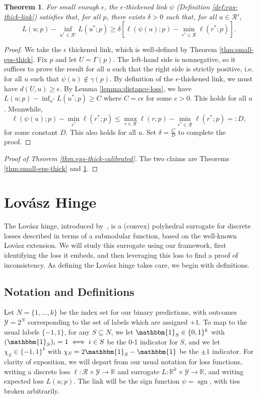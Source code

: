 \documentclass[12pt]{article}
\newcommand{\reals}{\mathbb{R}}
\newcommand{\R}{\mathcal{R}}
\newcommand{\Y}{\mathcal{Y}}
\newcommand{\ones}{\mathbbm{1}}
\DeclareMathOperator*{\sgn}{sgn}
\newtheorem{theorem}{Theorem}
\begin{document}
\begin{theorem} \label{thm:app-eps-thick-sep}
  For small enough $\epsilon$, the $\epsilon$-thickened link $\psi$ (Definition \ref{def:eps-thick-link}) satisfies that, for all $p$, there exists $\delta > 0$ such that, for all $u \in \R'$,
    \[ L(u;p) - \inf_{u^* \in \R'} L(u^*;p) \geq \delta \left[ \ell(\psi(u);p) - \min_{r^* \in \R} \ell(r^*;p) \right] . \]
\end{theorem}
\begin{proof}
  We take the $\epsilon$ thickened link, which is well-defined by Theorem \ref{thm:small-eps-thick}.
  Fix $p$ and let $U = \Gamma(p)$.
  The left-hand side is nonnegative, so it suffices to prove the result for all $u$ such that the right side is strictly positive, i.e. for all $u$ such that $\psi(u) \not\in \gamma(p)$.
  By definition of the $\epsilon$-thickened link, we must have $d(U,u) \geq \epsilon$.
  By Lemma \ref{lemma:distance-loss}, we have $L(u;p) - \inf_{u^*} L(u^*;p) \geq C$ where $C = c\epsilon$ for some $c > 0$.
  This holds for all $u$.
  Meanwhile,
    \[ \ell(\psi(u);p) - \min_{r^*} \ell(r^*;p) \leq \max_{r \in \R} \ell(r;p) - \min_{r^* \in \R} \ell(r^*;p) =: D, \]
  for some constant $D$.
  This also holds for all $u$.
  Set $\delta = \frac{C}{D}$ to complete the proof.
\end{proof}

\begin{proof}[Proof of Theorem \ref{thm:eps-thick-calibrated}]
  The two claims are Theorems \ref{thm:small-eps-thick} and \ref{thm:app-eps-thick-sep}.
\end{proof}




\section{Lov\'asz Hinge}\label{app:lovasz}

The Lov\'asz hinge, introduced by~\citet{yu2018lovasz}, is a (convex) polyhedral surrogate for discrete losses described in terms of a submodular function, based on the well-known Lov\'asz extension.
We will study this surrogate using our framework, first identifying the loss it embeds, and then leveraging this loss to find a proof of inconsistency.
As defining the Lov\'asz hinge takes care, we begin with definitions.

\subsection{Notation and Definitions}
Let $N = \{1,\ldots,k\}$ be the index set for our binary predictions, with outcomes $\Y = 2^N$ corresponding to the set of labels which are assigned $+1$.
To map to the usual labels $\{-1,1\}$, for any $S\subseteq N$, we let $\ones_S \in \{0,1\}^k$ with $(\ones_S)_i = 1 \iff i\in S$ be the 0-1 indicator for $S$, and we let $\chi_S \in \{-1,1\}^k$ with $\chi_S = 2\ones_S - \ones$ be the $\pm 1$ indicator.
For clarity of exposition, we will depart from our usual notation for loss functions, writing a discrete loss $\ell : \R \times \Y \to \reals$ and surrogate $L : \reals^k \times \Y \to \reals$, and writing expected loss $L(u;p)$.
The link will be the sign function $\psi = \sgn$, with ties broken arbitrarily.
\end{document}
